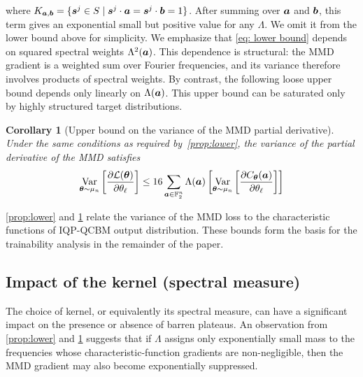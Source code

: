 \documentclass{article}
\theoremstyle{plain}
\newtheorem{corollary}[theorem]{Corollary}
\theoremstyle{definition}
\theoremstyle{remark}
\begin{document}
where $K_{{\bm{a}},{\bm{b}}} = \{{\bm{s}^j}\in S \mid {\bm{s}^j}\cdot{\bm{a}}={\bm{s}^j}\cdot{\bm{b}}=1\}$. After summing over ${\bm{a}}$ and ${\bm{b}}$, this term gives an exponential small but positive value for any $\Lambda$. We omit it from the lower bound above for simplicity.
We emphasize that \cref{eq: lower bound} depends on squared spectral weights $\Lambda^2({\bm{a}})$. This dependence is structural: the MMD gradient is a weighted sum over Fourier frequencies, and its variance therefore involves products of spectral weights. By contrast, the following loose upper bound depends only linearly on $\Lambda({\bm{a}})$. This upper bound can be saturated only by highly structured target distributions.  
\begin{corollary}[Upper bound on the variance of the MMD partial derivative] \label{prop:upper} 
Under the same conditions as required by~\cref{prop:lower}, the variance of the partial derivative of the MMD satisfies
\begin{equation}
    \operatorname*{Var}_{{\bm{\theta}} \sim\mu_n} \left[ \frac{\partial \mathcal{L}({\bm{\theta}})}{\partial \theta_\ell} \right] \leq 16 \sum_{{\bm{a}}\in \mathbb{F}_2^n} \Lambda({\bm{a}})\left[  \operatorname*{Var}_{{\bm{\theta}}\sim\mu_n} \left[ \frac{\partial C_{\bm{\theta}}({\bm{a}})}{\partial \theta_\ell} \right]\right]
\end{equation}
\end{corollary}
\cref{prop:lower} and \cref{prop:upper} relate the variance of the MMD loss to the characteristic functions of IQP-QCBM output distribution. These bounds form the basis for the trainability analysis in the remainder of the paper.

\subsection{Impact of the kernel (spectral measure)}
\label{subsec:kernel choice}
The choice of kernel, or equivalently its spectral measure, can have a significant impact on the presence or absence of barren plateaus. An observation from \cref{prop:lower} and \cref{prop:upper} suggests that if $\Lambda$ assigns only exponentially small mass to the frequencies whose characteristic-function gradients are non-negligible, then the MMD gradient may also become exponentially suppressed. 
\end{document}
